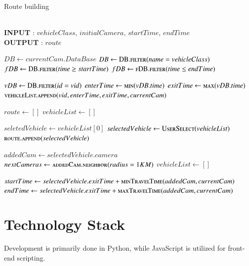 \begin{breakablealgorithm}
	\caption{Route building}
	~~ \\\textbf{INPUT} : $vehicleClass$, $initialCamera$, $startTime$, $endTime$
	\\ \textbf{OUTPUT} : $route$
	\begin{algorithmic}[1]	
		 
			\State $DB \gets currentCam.DataBase$
			\State $DB \gets \Call{DB.filter}{name=vehicleClass}$
			\State $fDB \gets \Call{DB.filter}{time \geq startTime}$
			\State $fDB \gets \Call{fDB.filter}{time \leq endTime}$
			
				\State $vDB \gets \Call{DB.filter}{id = vid}$
				\State $enterTime \gets \Call{min}{vDB.time}$
				\State $exitTime \gets \Call{max}{vDB.time}$
				\State $\Call{vehicleList.append}{vid,enterTime,exitTime,currentCam}$
			\EndFor
		\EndFunction
		
		\State $route \gets []$
		\State $vehicleList \gets []$
		\State {} 
			
		
				\State $seletedVehicle \gets vehicleList[0]$
			\Else
				\State $selectedVehicle \gets \Call{UserSelect}{vehicleList}$ 
			\EndIf
			\State $\Call{route.append}{selectedVehicle}$ 
			
			\State $addedCam \gets selectedVehicle.camera$
			\State $nextCameras \gets \Call{addedCam.neighbor}{radius=1KM}$
			\State $vehicleList \gets []$
			
			 
				\State $startTime \gets selectedVehicle.exitTime + \Call{minTravelTime}{addedCam,currentCam}$
				\State $endTime \gets selectedVehicle.exitTime + \Call{maxTravelTime}{addedCam,currentCam}$
				
				\State {} 
			\EndFor
		\EndWhile
		\State {} 
	\end{algorithmic}
\end{breakablealgorithm}

\section{Technology Stack}
Development is primarily done in Python, while JavaScript is utilized for front-end scripting.


